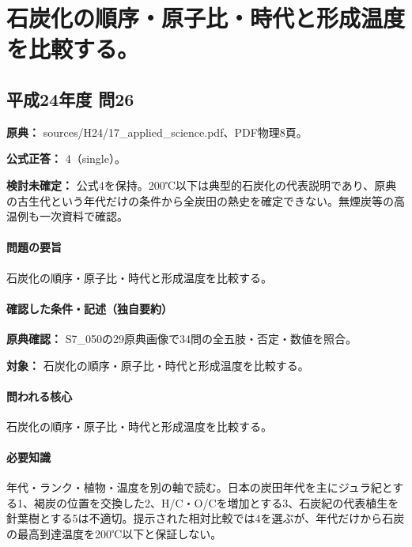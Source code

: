 \section{石炭化の順序・原子比・時代と形成温度を比較する。}

\subsection{平成24年度 問26}
\label{q:h24-reg-applied-26}

\noindent\textbf{原典：} sources/H24/17\_applied\_science.pdf、PDF物理8頁。

\textbf{公式正答：} 4（single）。

\par\textbf{検討未確定：} 公式4を保持。200℃以下は典型的石炭化の代表説明であり、原典の古生代という年代だけの条件から全炭田の熱史を確定できない。無煙炭等の高温例も一次資料で確認。

\paragraph{問題の要旨} 石炭化の順序・原子比・時代と形成温度を比較する。

\paragraph{確認した条件・記述（独自要約）}\mbox{}\par

\noindent\textbf{原典確認：} S7\_050の29原典画像で34問の全五肢・否定・数値を照合。\par

\noindent\textbf{対象：} 石炭化の順序・原子比・時代と形成温度を比較する。\par

\paragraph{問われる核心} 石炭化の順序・原子比・時代と形成温度を比較する。

\paragraph{必要知識} 年代・ランク・植物・温度を別の軸で読む。日本の炭田年代を主にジュラ紀とする1、褐炭の位置を交換した2、H/C・O/Cを増加とする3、石炭紀の代表植生を針葉樹とする5は不適切。提示された相対比較では4を選ぶが、年代だけから石炭の最高到達温度を200℃以下と保証しない。

